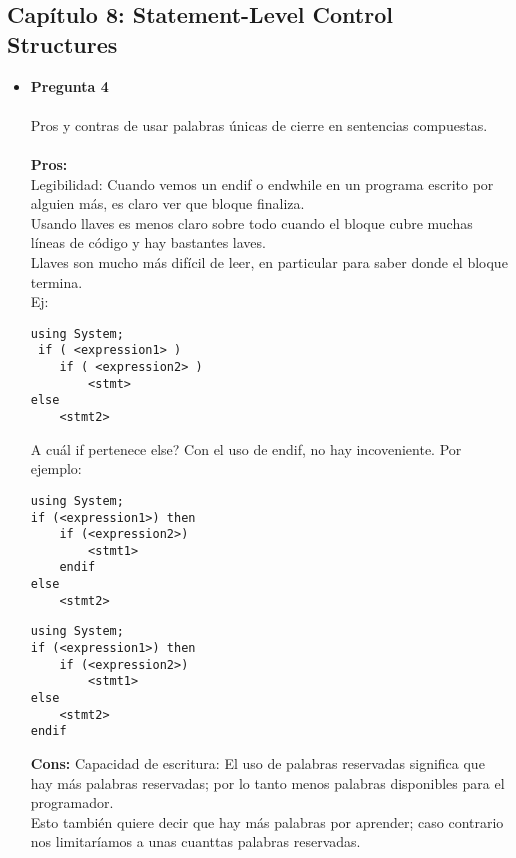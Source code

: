 \documentclass[12pt,oneside]{article}
\begin{document}
\subsection{Capítulo 8: Statement-Level Control Structures}
\begin{itemize}
\item {\bf Pregunta 4} \\\\
Pros y contras de usar palabras únicas de cierre en sentencias compuestas. \\\\
{\bf Pros:}\\
Legibilidad: Cuando vemos un endif o endwhile en un programa escrito por alguien más, es claro ver que bloque finaliza.\\
Usando llaves {} es menos claro sobre todo cuando el bloque cubre muchas líneas de código y hay bastantes laves.\\
Llaves son mucho más difícil de leer, en particular para saber donde el bloque termina.\\
Ej:
\begin{lstlisting}[frame=single]  % Start your code-block
using System;
 if ( <expression1> )
	if ( <expression2> )
		<stmt>
else
	<stmt2>
\end{lstlisting}
A cuál if pertenece else? Con el uso de endif, no hay incoveniente. Por ejemplo:\\
\begin{lstlisting}[frame=single]  % Start your code-block
using System;
if (<expression1>) then 			
	if (<expression2>) 							
		<stmt1> 								
	endif 								
else 										
	<stmt2>							
\end{lstlisting}
\begin{lstlisting}[frame=single]  % Start your code-block
using System;
if (<expression1>) then
	if (<expression2>)
		<stmt1> 								
else
	<stmt2>
endif
\end{lstlisting}

{\bf Cons:} 
Capacidad de escritura: El uso de palabras reservadas significa que hay más palabras reservadas; por lo tanto menos palabras disponibles para el programador.\\
Esto también quiere decir que hay más palabras por aprender; caso contrario nos limitaríamos a unas cuanttas palabras reservadas.
\end{itemize}

\end{document}
